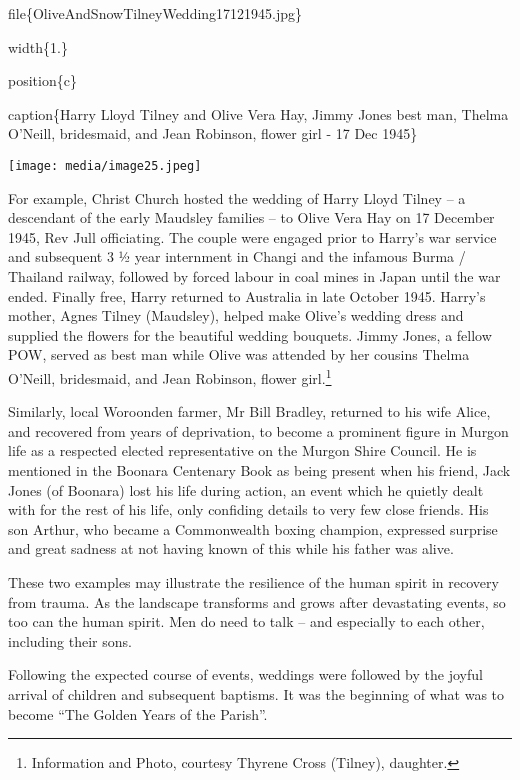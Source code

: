 file\{OliveAndSnowTilneyWedding17121945.jpg\}

width\{1.\}

position\{c\}

caption\{Harry Lloyd Tilney and Olive Vera Hay, Jimmy Jones best man, Thelma O'Neill, bridesmaid, and Jean Robinson, flower girl - 17 Dec 1945\}

\texttt{[image: media/image25.jpeg]}

For example, Christ Church hosted the wedding of Harry Lloyd Tilney -- a descendant of the early Maudsley families -- to Olive Vera Hay on 17 December 1945, Rev Jull officiating. The couple were engaged prior to Harry's war service and subsequent 3 ½ year internment in Changi and the infamous Burma / Thailand railway, followed by forced labour in coal mines in Japan until the war ended. Finally free, Harry returned to Australia in late October 1945. Harry's mother, Agnes Tilney (Maudsley), helped make Olive's wedding dress and supplied the flowers for the beautiful wedding bouquets. Jimmy Jones, a fellow POW, served as best man while Olive was attended by her cousins Thelma O'Neill, bridesmaid, and Jean Robinson, flower girl.\footnote{Information and Photo, courtesy Thyrene Cross (Tilney), daughter.}

Similarly, local Woroonden farmer, Mr Bill Bradley, returned to his wife Alice, and recovered from years of deprivation, to become a prominent figure in Murgon life as a respected elected representative on the Murgon Shire Council. He is mentioned in the Boonara Centenary Book as being present when his friend, Jack Jones (of Boonara) lost his life during action, an event which he quietly dealt with for the rest of his life, only confiding details to very few close friends. His son Arthur, who became a Commonwealth boxing champion, expressed surprise and great sadness at not having known of this while his father was alive.

These two examples may illustrate the resilience of the human spirit in recovery from trauma. As the landscape transforms and grows after devastating events, so too can the human spirit. Men do need to talk -- and especially to each other, including their sons.

Following the expected course of events, weddings were followed by the joyful arrival of children and subsequent baptisms. It was the beginning of what was to become ``The Golden Years of the Parish''.

